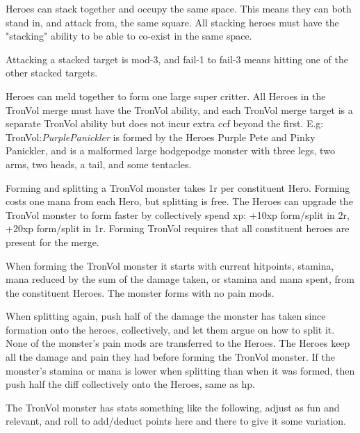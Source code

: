  Heroes can stack together and occupy the same space. This means they can both stand in, and attack from, the same square. All stacking heroes must have the "stacking" ability to be able to co-exist in the same space.

Attacking a stacked target is mod-3, and fail-1 to fail-3 means hitting one of the other stacked targets.




 Heroes can meld together to form one large super critter. All Heroes in the TronVol merge must have the TronVol ability, and each TronVol merge target is a separate TronVol ability but does not incur extra ccf beyond the first.
E.g: TronVol:\emph{PurplePanickler} is formed by the Heroes Purple Pete and Pinky Panickler, and is a malformed large hodgepodge monster with three legs, two arms, two heads, a tail, and some tentacles.

Forming and splitting a TronVol monster takes 1r per constituent Hero. Forming costs one mana from each Hero, but splitting is free. The Heroes can upgrade the TronVol monster to form faster by collectively spend xp: +10xp form/split in 2r, +20xp form/split in 1r.
Forming TronVol requires that all constituent heroes are present for the merge.

When forming the TronVol monster it starts with current hitpoints, stamina, mana reduced by the sum of the damage taken, or stamina and mana spent, from the constituent Heroes.
The monster forms with no pain mods.

When splitting again, push half of the damage the monster has taken since formation onto the heroes, collectively, and let them argue on how to split it. None of the monster's pain mods are transferred to the Heroes. The Heroes keep all the damage and pain they had before forming the TronVol monster. If the monster's stamina or mana is lower when splitting than when it was formed, then push half the diff collectively onto the Heroes, same as hp.

The TronVol monster has stats something like the following, adjust as fun and relevant, and roll to add/deduct points here and there to give it some variation.

